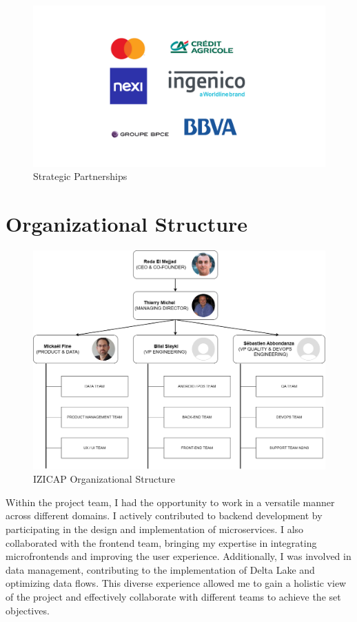 \begin{figure}[H]
\centering
\includegraphics[width=\linewidth]{images/partenaires.png}
\caption{Strategic Partnerships}\label{fig:partnerships}
\end{figure}

\section{Organizational Structure}
\begin{figure}[H]
\centering
\includegraphics[width=0.75\linewidth]{images/organigram.png}
\caption{IZICAP Organizational Structure}\label{fig:organigram}
\end{figure}

Within the project team, I had the opportunity to work in a versatile manner across different domains. I actively contributed to backend development by participating in the design and implementation of microservices. I also collaborated with the frontend team, bringing my expertise in integrating microfrontends and improving the user experience. Additionally, I was involved in data management, contributing to the implementation of Delta Lake and optimizing data flows. This diverse experience allowed me to gain a holistic view of the project and effectively collaborate with different teams to achieve the set objectives.

